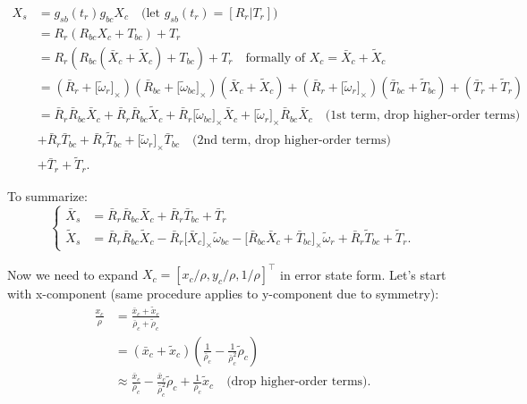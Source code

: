 \documentclass[letter,10pt]{article}
\newcommand{\asym}[1]{{\lbrack #1\rbrack}_\times{}}
\begin{document}
\begin{equation}
\begin{aligned}
X_s &= g_{sb}(t_r) g_{bc} X_c \quad\text{(let } g_{sb}(t_r)=[R_r|T_r] \text{)}\\
&= R_r(R_{bc} X_c + T_{bc}) + T_r \\ 
&= R_r(R_{bc} (\bar X_c + \tilde X_c)
+ T_{bc}) + T_r \quad\text{formally of } X_c = \bar X_c + \tilde X_c\\
&= (\bar R_r + \asym{\tilde \omega_r})(\bar R_{bc} + \asym{\tilde \omega_{bc}})(\bar X_c + \tilde X_c) + (\bar R_r + \asym{\tilde \omega_r})(\bar T_{bc} + \tilde T_{bc}) + (\bar T_r + \tilde T_r) \\
&= \bar R_r \bar R_{bc} \bar X_c  + 
\bar R_r \bar R_{bc} \tilde X_c +
\bar R_r \asym{\tilde\omega_{bc}} \bar X_c +
\asym{\tilde \omega_r} \bar R_{bc} \bar X_c \quad\text{(1st term, drop higher-order terms)}\\
&+ \bar R_r \bar T_{bc} + \bar R_r \tilde T_{bc} + \asym{\tilde\omega_r} \bar T_{bc} \quad\text{(2nd term, drop higher-order terms)}\\
&+ \bar T_r + \tilde T_r.
\end{aligned}
\end{equation}

To summarize:
\begin{equation}
\begin{cases}
\bar X_s &= \bar R_r \bar R_{bc} \bar X_c + \bar R_r \bar T_{bc} + \bar T_r\\
\tilde X_s &= \bar R_r \bar R_{bc} \tilde X_c - \bar R_r \asym{\bar X_c} \tilde \omega_{bc} - \asym{\bar R_{bc}\bar X_c + \bar T_{bc}} \tilde \omega_r + \bar R_r \tilde T_{bc} + \tilde T_r.
\end{cases}
\end{equation}

Now we need to expand $X_c = [x_c/\rho, y_c/\rho, 1/\rho]^\top$ in error state form. Let's start with x-component (same procedure applies to y-component due to symmetry):
\begin{equation}
\begin{aligned}
\frac{x_c}{\rho}
&= \frac{\bar x_c + \tilde x_c}{\bar \rho_c + \tilde \rho_c} \\
&= (\bar x_c + \tilde x_c)(\frac{1}{\bar \rho_c} - \frac{1}{\bar \rho_c^2}\tilde \rho_c)\\
&\approx \frac{\bar x_c}{\bar\rho_c} - \frac{\bar x_c}{\bar \rho_c^2} \tilde\rho_c + \frac{1}{\bar \rho_c} \tilde x_c \quad\text{(drop higher-order terms)}.
\end{aligned}
\end{equation}
\end{document}
